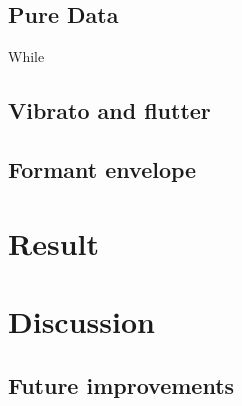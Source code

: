 \documentclass{article}
\begin{document}
\subsection{Pure Data}
While

\subsection{Vibrato and flutter}

\subsection{Formant envelope}

\section{Result}\label{sec:result}
%

\section{Discussion}\label{sec:discussion}


\subsection{Future improvements}


\end{document}
